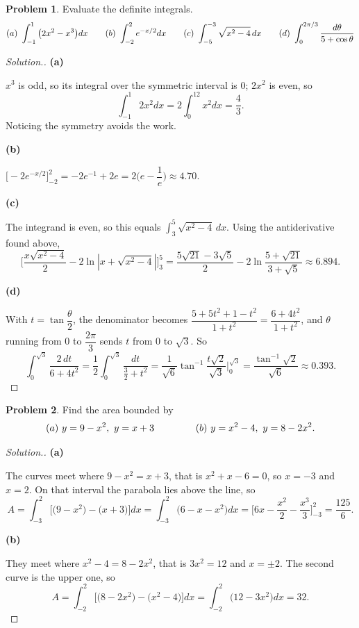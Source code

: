 \documentclass[11pt,a4paper]{article}
\theoremstyle{definition}
\newtheorem{problemx}{Problem}[subsection]
\newenvironment{problem}{\begin{problemx}}{\end{problemx}}
\newenvironment{solution}
  {\renewcommand{\qedsymbol}{}\begin{proof}[\textit{Solution}.]}
  {\end{proof}}
\newcommand{\subhead}[1]{%
  \par\medskip\noindent\textbf{#1}\par\nobreak\smallskip}
\begin{document}
\begin{problem}
Evaluate the definite integrals.
$$(a)\ \int_{-1}^{1}\big(2x^2-x^3\big)dx\hspace{0.7cm}
(b)\ \int_{-2}^{2}e^{-x/2}dx\hspace{0.7cm}
(c)\ \int_{-5}^{-3}\sqrt{x^2-4}\,dx\hspace{0.7cm}
(d)\ \int_0^{2\pi/3}\frac{d\theta}{5+\cos\theta}$$
\end{problem}
\begin{solution}
\subhead{(a)} $x^3$ is odd, so its integral over the symmetric interval is $0$;
$2x^2$ is even, so
$$\int_{-1}^{1}2x^2dx = 2\int_0^12x^2dx = \frac43 .$$
Noticing the symmetry avoids the work.

\subhead{(b)}
$\Big[-2e^{-x/2}\Big]_{-2}^{2} = -2e^{-1} + 2e = 2\Big(e - \dfrac1e\Big)
\approx 4.70$.

\subhead{(c)} The integrand is even, so this equals
$\displaystyle\int_3^5\sqrt{x^2-4}\,dx$. Using the antiderivative found above,
$$\Big[\frac{x\sqrt{x^2-4}}{2} - 2\ln\left|x+\sqrt{x^2-4}\right|\Big]_3^5
= \frac{5\sqrt{21}-3\sqrt5}{2} - 2\ln\frac{5+\sqrt{21}}{3+\sqrt5}
\approx 6.894 .$$

\subhead{(d)} With $t = \tan\dfrac{\theta}{2}$, the denominator becomes
$\dfrac{5+5t^2+1-t^2}{1+t^2} = \dfrac{6+4t^2}{1+t^2}$, and $\theta$ running
from $0$ to $\dfrac{2\pi}{3}$ sends $t$ from $0$ to $\sqrt3$. So
$$\int_0^{\sqrt3}\frac{2\,dt}{6+4t^2}
= \frac12\int_0^{\sqrt3}\frac{dt}{\frac32+t^2}
= \frac{1}{\sqrt6}\tan^{-1}\!\frac{t\sqrt2}{\sqrt3}\Big|_0^{\sqrt3}
= \frac{\tan^{-1}\sqrt2}{\sqrt6}\approx 0.393 .$$
\end{solution}

\begin{problem}
Find the area bounded by
$$(a)\ y = 9-x^2,\ y = x+3\hspace{1.5cm}
(b)\ y = x^2-4,\ y = 8-2x^2 .$$
\end{problem}
\begin{solution}
\subhead{(a)} The curves meet where $9-x^2 = x+3$, that is
$x^2+x-6 = 0$, so $x = -3$ and $x = 2$. On that interval the parabola lies
above the line, so
$$A = \int_{-3}^{2}\Big[\big(9-x^2\big) - \big(x+3\big)\Big]dx
= \int_{-3}^{2}\big(6 - x - x^2\big)dx
= \Big[6x - \frac{x^2}{2} - \frac{x^3}{3}\Big]_{-3}^{2} = \frac{125}{6}.$$

\subhead{(b)} They meet where $x^2-4 = 8-2x^2$, that is $3x^2 = 12$ and
$x = \pm 2$. The second curve is the upper one, so
$$A = \int_{-2}^{2}\Big[\big(8-2x^2\big)-\big(x^2-4\big)\Big]dx
= \int_{-2}^{2}\big(12-3x^2\big)dx = 32 .$$
\end{solution}
\end{document}
